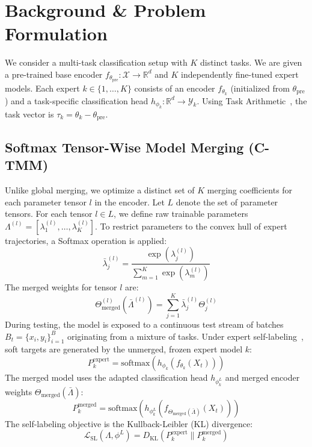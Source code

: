 \documentclass{article}
\theoremstyle{plain}
\theoremstyle{definition}
\theoremstyle{remark}
\begin{document}
\section{Background \& Problem Formulation}
\label{sec:background}
We consider a multi-task classification setup with $K$ distinct tasks. We are given a pre-trained base encoder $f_{\theta_{\text{pre}}} : \mathcal{X} \to \mathbb{R}^d$ and $K$ independently fine-tuned expert models. Each expert $k \in \{1, \dots, K\}$ consists of an encoder $f_{\theta_k}$ (initialized from $\theta_{\text{pre}}$) and a task-specific classification head $h_{\phi_k} : \mathbb{R}^d \to \mathcal{Y}_k$. Using Task Arithmetic~\cite{ilharco2022editing}, the task vector is $\tau_k = \theta_k - \theta_{\text{pre}}$.

\subsection{Softmax Tensor-Wise Model Merging (C-TMM)}
Unlike global merging, we optimize a distinct set of $K$ merging coefficients for each parameter tensor $l$ in the encoder. Let $L$ denote the set of parameter tensors. For each tensor $l \in L$, we define raw trainable parameters $\Lambda^{(l)} = [\lambda^{(l)}_1, \dots, \lambda^{(l)}_K]$. To restrict parameters to the convex hull of expert trajectories, a Softmax operation is applied:
\begin{equation}
\bar{\lambda}^{(l)}_j = \frac{\exp(\lambda^{(l)}_j)}{\sum_{m=1}^K \exp(\lambda^{(l)}_m)}
\end{equation}
The merged weights for tensor $l$ are:
\begin{equation}
\Theta^{(l)}_{\text{merged}}(\bar{\Lambda}^{(l)}) = \sum_{j=1}^K \bar{\lambda}^{(l)}_j \Theta^{(l)}_j
\end{equation}
During testing, the model is exposed to a continuous test stream of batches $B_t = \{x_i, y_i\}_{i=1}^B$ originating from a mixture of tasks. Under expert self-labeling~\cite{jung2025symerge}, soft targets are generated by the unmerged, frozen expert model $k$:
\begin{equation}
P^{\text{expert}}_k = \text{softmax}(h_{\phi_k}(f_{\theta_k}(X_t)))
\end{equation}
The merged model uses the adapted classification head $h_{\phi^L_k}$ and merged encoder weights $\Theta_{\text{merged}}(\bar{\Lambda})$:
\begin{equation}
P^{\text{merged}}_k = \text{softmax}(h_{\phi^L_k}(f_{\Theta_{\text{merged}}(\bar{\Lambda})}(X_t)))
\end{equation}
The self-labeling objective is the Kullback-Leibler (KL) divergence:
\begin{equation}
\mathcal{L}_{\text{SL}}(\Lambda, \phi^L) = D_{\text{KL}}(P^{\text{expert}}_k \parallel P^{\text{merged}}_k)
\end{equation}
\end{document}
